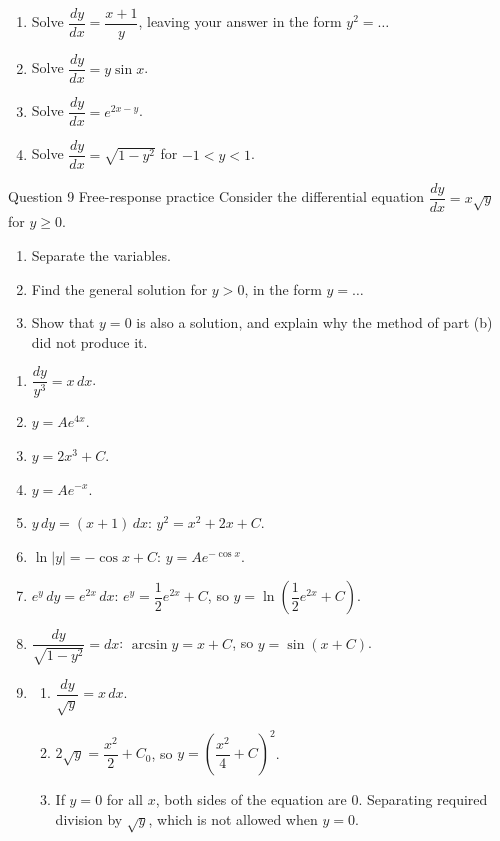 \documentclass[11pt]{article}
\begin{document}
\begin{enumerate}[leftmargin=*,itemsep=2pt,start=5]
  \item Solve $\dfrac{dy}{dx}=\dfrac{x+1}{y}$, leaving your answer in the form $y^2=\ldots$\work{2.8cm}
  \item Solve $\dfrac{dy}{dx}=y\sin x$.\work{2.8cm}
  \item Solve $\dfrac{dy}{dx}=e^{2x-y}$.\work{2.8cm}
  \item Solve $\dfrac{dy}{dx}=\sqrt{1-y^2}$ for $-1<y<1$.\work{2.8cm}
\end{enumerate}

\begin{frbox}{Question 9 \textperiodcentered{} Free-response practice}
Consider the differential equation $\dfrac{dy}{dx}=x\sqrt{y}$ for $y\ge0$.
\begin{enumerate}[label=(\alph*),leftmargin=*,itemsep=2pt]
  \item Separate the variables.\work{2.6cm}
  \item Find the general solution for $y>0$, in the form $y=\ldots$\work{2.6cm}
  \item Show that $y=0$ is also a solution, and explain why the method of part (b) did not produce it.\work{2.6cm}
\end{enumerate}
\end{frbox}

\newpage
\begin{solbox}
\begin{enumerate}[leftmargin=*,itemsep=4pt]
  \item $\dfrac{dy}{y^3}=x\,dx$.
  \item $y=Ae^{4x}$.
  \item $y=2x^3+C$.
  \item $y=Ae^{-x}$.
  \item $y\,dy=(x+1)\,dx$: $y^2=x^2+2x+C$.
  \item $\ln|y|=-\cos x+C$: $y=Ae^{-\cos x}$.
  \item $e^{y}\,dy=e^{2x}\,dx$: $e^{y}=\dfrac12e^{2x}+C$, so $y=\ln\!\left(\dfrac12e^{2x}+C\right)$.
  \item $\dfrac{dy}{\sqrt{1-y^2}}=dx$: $\arcsin y=x+C$, so $y=\sin(x+C)$.
  \item \begin{enumerate}[label=(\alph*),leftmargin=*,itemsep=3pt]
    \item $\dfrac{dy}{\sqrt y}=x\,dx$.
    \item $2\sqrt y=\dfrac{x^2}{2}+C_0$, so $y=\left(\dfrac{x^2}{4}+C\right)^2$.
    \item If $y=0$ for all $x$, both sides of the equation are 0. Separating required division by $\sqrt y$, which is not allowed when $y=0$.
  \end{enumerate}
\end{enumerate}
\end{solbox}
\end{document}
